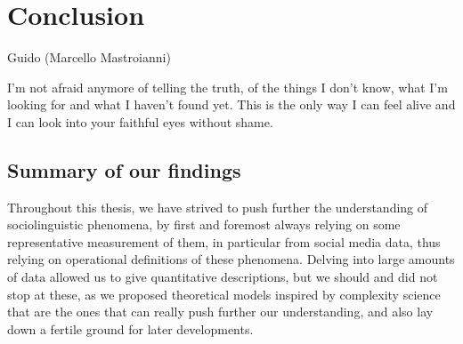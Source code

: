 \documentclass[../thesis.tex]{subfiles}
\begin{document}
\chapter{Conclusion}
\label{ch:conclusion}

\epigraph{
  \begin{center}
    \textnormal{Guido (Marcello Mastroianni)}\\
  \end{center}
  I'm not afraid anymore of telling the truth, of the things I don't know, what I'm
  looking for and what I haven't found yet. This is the only way I can feel alive and I
  can look into your faithful eyes without shame.
}{
}


\section{Summary of our findings}
Throughout this thesis, we have strived to push further the understanding of
sociolinguistic phenomena, by first and foremost always relying on some representative
measurement of them, in particular from social media data, thus relying on operational
definitions of these phenomena. Delving into large amounts of data allowed us to give
quantitative descriptions, but we should and did not stop at these, as we proposed
theoretical models inspired by complexity science that are the ones that can really push
further our understanding, and also lay down a fertile ground for later developments.
\end{document}
